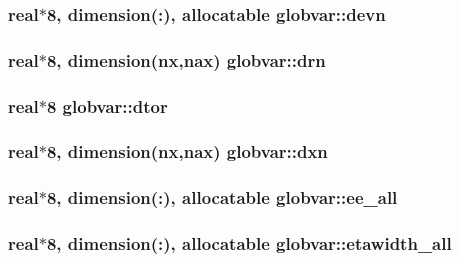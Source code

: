 \subsubsection[{devn}]{\setlength{\rightskip}{0pt plus 5cm}real$\ast$8, dimension(\+:), allocatable globvar\+::devn}\label{namespaceglobvar_abfd9d4eb33cd8633c8aad2c1d7678bb2}
\hypertarget{namespaceglobvar_a0544b64f4820db57c4ed8336dd2f6614}{}
\subsubsection[{drn}]{\setlength{\rightskip}{0pt plus 5cm}real$\ast$8, dimension({\bf nx},{\bf nax}) globvar\+::drn}\label{namespaceglobvar_a0544b64f4820db57c4ed8336dd2f6614}
\hypertarget{namespaceglobvar_a3346ec2679bdcc117cc6b09e8eb2a7dd}{}
\subsubsection[{dtor}]{\setlength{\rightskip}{0pt plus 5cm}real$\ast$8 globvar\+::dtor}\label{namespaceglobvar_a3346ec2679bdcc117cc6b09e8eb2a7dd}
\hypertarget{namespaceglobvar_a35cf297d0ef47b9b767c8840cd2e943c}{}
\subsubsection[{dxn}]{\setlength{\rightskip}{0pt plus 5cm}real$\ast$8, dimension({\bf nx},{\bf nax}) globvar\+::dxn}\label{namespaceglobvar_a35cf297d0ef47b9b767c8840cd2e943c}
\hypertarget{namespaceglobvar_a7037a7dd30b11e09190ebb70e483c63f}{}
\subsubsection[{ee\+\_\+all}]{\setlength{\rightskip}{0pt plus 5cm}real$\ast$8, dimension(\+:), allocatable globvar\+::ee\+\_\+all}\label{namespaceglobvar_a7037a7dd30b11e09190ebb70e483c63f}
\hypertarget{namespaceglobvar_af0124c85b1f11468ffb36b627963bf6a}{}
\subsubsection[{etawidth\+\_\+all}]{\setlength{\rightskip}{0pt plus 5cm}real$\ast$8, dimension(\+:), allocatable globvar\+::etawidth\+\_\+all}\label{namespaceglobvar_af0124c85b1f11468ffb36b627963bf6a}
\hypertarget{namespaceglobvar_a76a4a0e1d9be5d28829cd29c3e41a533}{}
